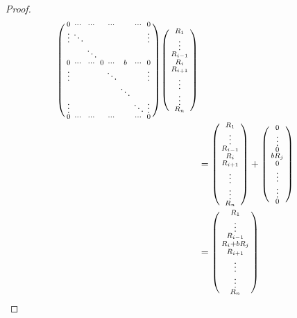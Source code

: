 \begin{proof}
\begin{align}
\begin{split}
				\smqty(\dmat{ 0 & \cdots & \cdots & & \cdots & & \cdots & 0 \\ %
							\vdots & \ddots & & & & & & \vdots \\ %
							& & \ddots & & & & & \\ %
							0 & \cdots & \cdots & 0 & \cdots & b & \cdots & 0 \\ %
							\vdots & & & & \ddots & & & \vdots \\ %
							& & & & & \ddots & & \\ %
							\vdots & & & & & & \ddots & \vdots \\ %
							0 & \cdots & \cdots & & \cdots & & \cdots & 0 }) %
				\smqty(\dmat{ R_{1} \\ %
							\vdots \\ %
							R_{i-1} \\ %
							R_{i} \\ %
							R_{i+1} \\ %
							\vdots \\ %
							\vdots \\ %
							R_{n} })\\
			&= \smqty(\dmat{ R_{1} \\ %
							\vdots \\ %
							R_{i-1} \\ %
							R_{i} \\ %
							R_{i+1} \\ %
							\vdots \\ %
							\vdots \\ %
							R_{n} }) + %
				\smqty(\dmat{ 0 \\ %
							\vdots \\ %
							0 \\ %
							b R_{j} \\ %
							0 \\ %
							\vdots \\ %
							\vdots \\ %
							0 })\\
			&= \smqty(\dmat{ R_{1} \\ %
							\vdots \\ %
							R_{i-1} \\ %
							R_{i} + b R_{j} \\ %
							R_{i+1} \\ %
							\vdots \\ %
							\vdots \\ %
							R_{n} })
		\end{split}
	\end{align}


\end{proof}
